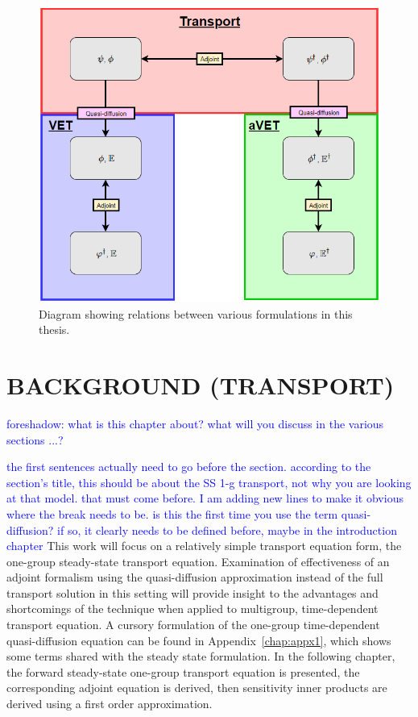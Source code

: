 \documentclass[12pt]{report}
\newcommand{\comment}[2]{\marginpar{\textcolor{#2}{$\star$}}\textcolor{#2}{#1}\newline}
\newcommand{\jcr}[1]{\comment{#1}{blue}}
\newcommand{\jcr}[1]{\phantom{a}}
\begin{document}
\begin{figure}[H]
\centering
  \includegraphics[scale=0.6]{figures2/RoadMap.png}
  \caption{Diagram showing relations between various formulations in this thesis.}
  \label{fig:roadmap}
\end{figure}


\chapter{\uppercase {Background (Transport)}} \label{chap:background}
\jcr{foreshadow: what is this chapter about? what will you discuss in the various sections ...?}

\jcr{the first sentences actually need to go before the section. according to the section's title, this should be about the SS 1-g transport, not why you are looking at that model. that must come before. I am adding new lines to make it obvious where the break needs to be.}
\jcr{is this the first time you use the term quasi-diffusion? if so, it clearly needs to be defined before, maybe in the introduction chapter}
This work will focus on a relatively simple transport equation form, the one-group steady-state transport equation. Examination of effectiveness of an adjoint formalism using the quasi-diffusion approximation instead of the full transport solution in this setting will provide insight to the advantages and shortcomings of the technique when applied to multigroup, time-dependent transport equation. A cursory formulation of the one-group time-dependent quasi-diffusion equation can be found in Appendix~\ref{chap:appx1}, which shows some terms shared with the steady state formulation. In the following chapter, the forward steady-state one-group transport equation is presented, the corresponding adjoint equation is derived, then sensitivity inner products are derived using a first order approximation. 
\end{document}
